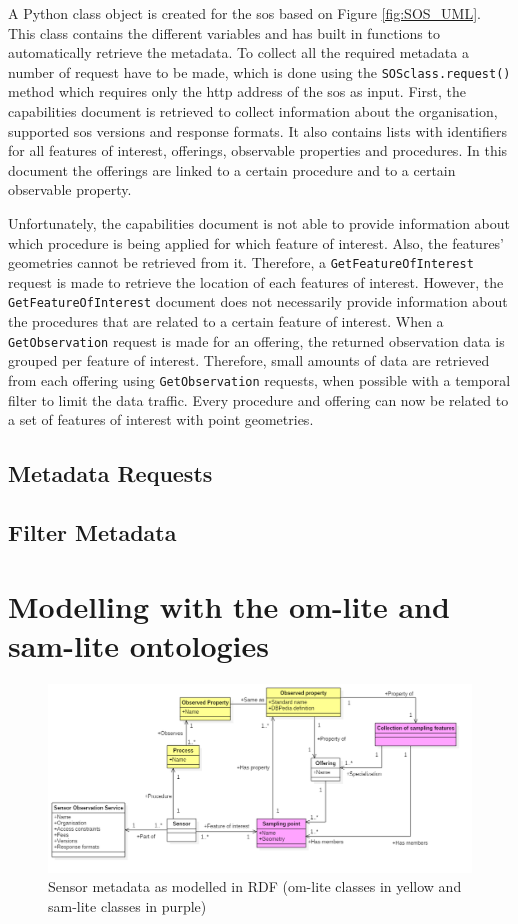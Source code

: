 A Python class object is created for the \ac{sos} based on Figure \ref{fig:SOS_UML}. This class contains the different variables and has built in functions to automatically retrieve the metadata. To collect all the required metadata a number of request have to be made, which is done using the \texttt{SOSclass.request()} method which requires only the \ac{http} address of the \ac{sos} as input. First, the capabilities document is retrieved to collect information about the organisation, supported \ac{sos} versions and response formats. It also contains lists with identifiers for all features of interest, offerings, observable properties and procedures. In this document the offerings are linked to a certain procedure and to a certain observable property. 

Unfortunately, the capabilities document is not able to provide information about which procedure is being applied for which feature of interest. Also, the features' geometries cannot be retrieved from it. Therefore, a \texttt{GetFeatureOfInterest} request is made to retrieve the location of each features of interest. However, the \texttt{GetFeatureOfInterest} document does not necessarily provide information about the procedures that are related to a certain feature of interest. When a \texttt{GetObservation} request is made for an offering, the returned observation data is grouped per feature of interest. 
Therefore, small amounts of data are retrieved from each offering using \texttt{GetObservation} requests, when possible with a temporal filter to limit the data traffic. 
Every procedure and offering can now be related to a set of features of interest with point geometries.  

\subsection{Metadata Requests}

\subsection{Filter Metadata}


\section{Modelling with the om-lite and sam-lite ontologies}
\begin{figure}
	\centering
	\includegraphics[width=1\linewidth]{UML/SOS_Semantic_UML.PNG}
	\caption{Sensor metadata as modelled in RDF (om-lite classes in yellow and sam-lite classes in purple)}
	\label{fig:SOS_Semantic_UML}
\end{figure}

